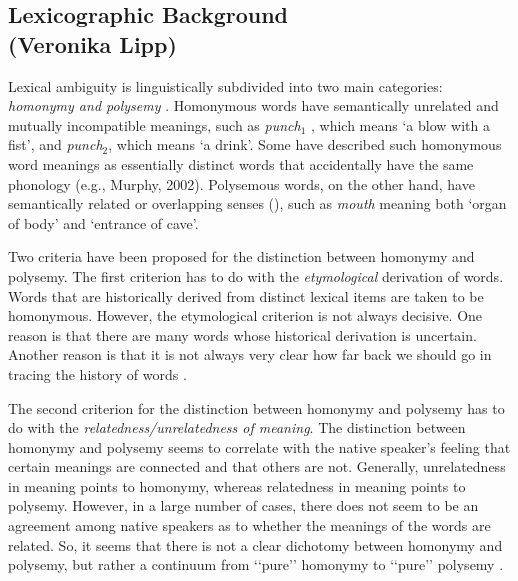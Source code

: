 \documentclass[11pt]{article}
\begin{document}
\pagebreak

\subsection{Lexicographic Background \\ (Veronika Lipp)}

\label{sec:bground}

Lexical ambiguity is linguistically subdivided into two main categories:
\emph{homonymy and polysemy} \citep{Cruse:2004}. Homonymous words have
semantically unrelated and mutually incompatible meanings, such as
\emph{punch$_1$} , which means `a blow with a fist', and \emph{punch$_2$},
which means `a drink'. Some have described such homonymous word meanings as
essentially distinct words that accidentally have the same phonology (e.g.,
Murphy, 2002). Polysemous words, on the other hand, have semantically related
or overlapping senses (\cite{Cruse:2004,Jackendoff:2002, Pustejovsky:1995}),
such as \emph{mouth} meaning both `organ of body' and `entrance of cave'.

Two criteria have been proposed for the distinction between homonymy and
polysemy. The first criterion has to do with the \emph{etymological} derivation
of words. Words that are historically derived from distinct lexical items are
taken to be homonymous. However, the etymological criterion is not always
decisive. One reason is that there are many words whose historical derivation
is uncertain. Another reason is that it is not always very clear how far back
we should go in tracing the history of words \citep{Lyons:1977}.

The second criterion for the distinction between homonymy and polysemy has to
do with the \emph{relatedness/unrelatedness of meaning}.  The distinction
between homonymy and polysemy seems to correlate with the native speaker’s
feeling that certain meanings are connected and that others are not. Generally,
unrelatedness in meaning points to homonymy, whereas relatedness in meaning
points to polysemy.  However, in a large number of cases, there does not seem
to be an agreement among native speakers as to whether the meanings of the
words are related. So, it seems that there is not a clear dichotomy between
homonymy and polysemy, but rather a continuum from ‘‘pure’’ homonymy to
‘‘pure’’ polysemy \citep{Lyons:1977}.
\end{document}
